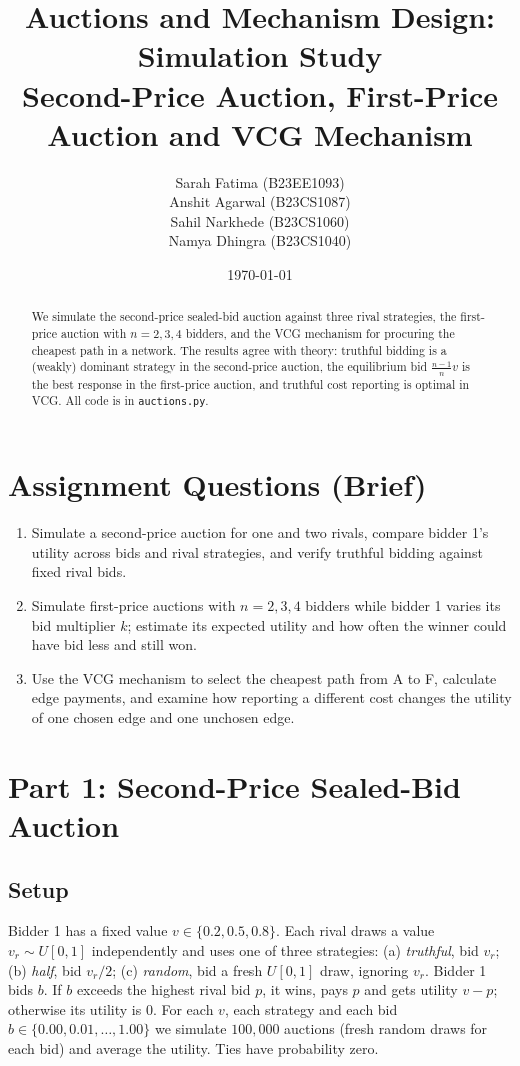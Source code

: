 \documentclass[11pt,a4paper]{article}
\title{\textbf{Auctions and Mechanism Design: Simulation Study}\\[4pt]
\large Second-Price Auction, First-Price Auction and VCG Mechanism}
\author{Sarah Fatima (B23EE1093)\\
Anshit Agarwal (B23CS1087)\\
Sahil Narkhede (B23CS1060)\\
Namya Dhingra (B23CS1040)}
\date{\today}
\begin{document}
\maketitle

\begin{abstract}
We simulate the second-price sealed-bid auction against three rival strategies, the first-price auction with $n=2,3,4$ bidders, and the VCG mechanism for procuring the cheapest path in a network. The results agree with theory: truthful bidding is a (weakly) dominant strategy in the second-price auction, the equilibrium bid $\frac{n-1}{n}v$ is the best response in the first-price auction, and truthful cost reporting is optimal in VCG. All code is in \texttt{auctions.py}.
\end{abstract}

\section*{Assignment Questions (Brief)}
\begin{enumerate}
\item Simulate a second-price auction for one and two rivals, compare bidder 1's utility across bids and rival strategies, and verify truthful bidding against fixed rival bids.
\item Simulate first-price auctions with $n=2,3,4$ bidders while bidder 1 varies its bid multiplier $k$; estimate its expected utility and how often the winner could have bid less and still won.
\item Use the VCG mechanism to select the cheapest path from A to F, calculate edge payments, and examine how reporting a different cost changes the utility of one chosen edge and one unchosen edge.
\end{enumerate}

\section{Part 1: Second-Price Sealed-Bid Auction}

\subsection{Setup}
Bidder 1 has a fixed value $v\in\{0.2,0.5,0.8\}$. Each rival draws a value $v_r\sim U[0,1]$ independently and uses one of three strategies: (a) \emph{truthful}, bid $v_r$; (b) \emph{half}, bid $v_r/2$; (c) \emph{random}, bid a fresh $U[0,1]$ draw, ignoring $v_r$.
Bidder 1 bids $b$. If $b$ exceeds the highest rival bid $p$, it wins, pays $p$ and gets utility $v-p$; otherwise its utility is $0$.
For each $v$, each strategy and each bid $b\in\{0.00,0.01,\dots,1.00\}$ we simulate $100{,}000$ auctions (fresh random draws for each bid) and average the utility. Ties have probability zero.
\end{document}
